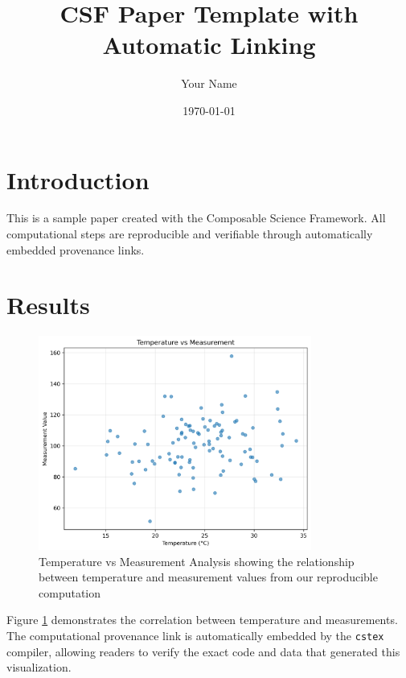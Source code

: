 \documentclass{article}
\title{CSF Paper Template with Automatic Linking}
\author{Your Name}
\date{\today}
\begin{document}
\maketitle

\section{Introduction}

This is a sample paper created with the Composable Science Framework.
All computational steps are reproducible and verifiable through automatically
embedded provenance links.

\section{Results}

\begin{figure}[h]
\centering
\includegraphics[width=0.8\textwidth]{figures/temperature_measurement.png}
\caption{Temperature vs Measurement Analysis showing the relationship between temperature and measurement values from our reproducible computation}
\label{fig:temperature}
\end{figure}

Figure \ref{fig:temperature} demonstrates the correlation between temperature
and measurements. The computational provenance link is automatically embedded
by the \texttt{cstex} compiler, allowing readers to verify the exact code and
data that generated this visualization.
\end{document}
